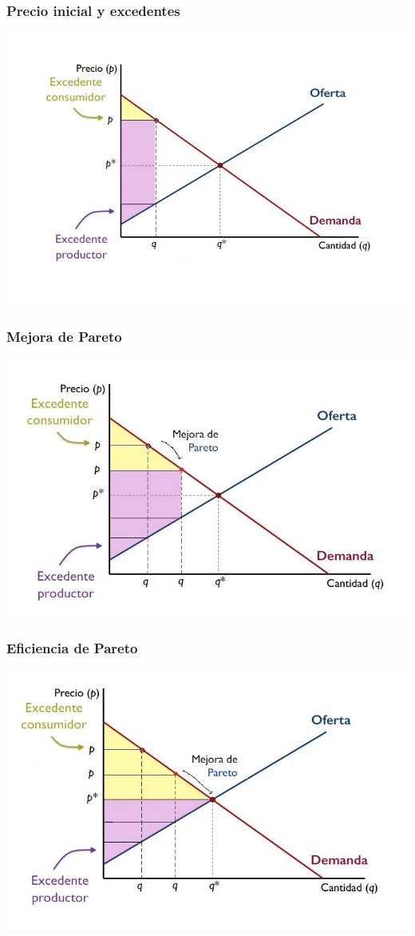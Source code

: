 \documentclass{beamer}
\begin{document}
\begin{frame}
\frametitle{ Precio inicial y excedentes}
\includegraphics[scale=0.6]{Figures/Tema_07.23_newexcedentes1.jpg}
\end{frame}

\begin{frame}
\frametitle{ Mejora de Pareto}
\includegraphics[scale=0.6]{Figures/Tema_07.23_newexcedentes2.jpg}
\end{frame}

\begin{frame}
\frametitle{ Eficiencia de Pareto}
\includegraphics[scale=0.6]{Figures/Tema_07.23_newexcedentes3.jpg}
\end{frame}
\end{document}
